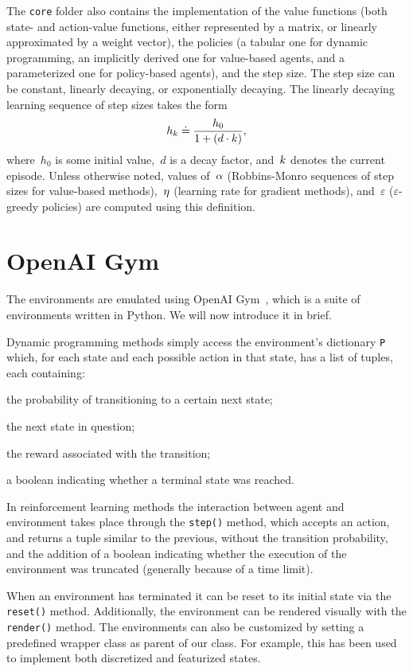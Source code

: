 The \texttt{core} folder also contains the implementation of the value functions (both state- and action-value functions, either represented by a matrix, or linearly approximated by a weight vector), the policies (a tabular one for dynamic programming, an implicitly derived one for value-based agents, and a parameterized one for policy-based agents), and the step size. The step size can be constant, linearly decaying, or exponentially decaying. The linearly decaying learning sequence of step sizes takes the form
\begin{equation}
    h_{k}\doteq\frac{h_{0}}{1+\left(d\cdot k\right)},
\end{equation}
where~${h_{0}}$ is some initial value,~${d}$ is a decay factor, and~${k}$ denotes the current episode. Unless otherwise noted, values of~${\alpha}$ (Robbins-Monro sequences of step sizes for value-based methods),~$\eta$ (learning rate for gradient methods), and~${\varepsilon}$ (${\varepsilon}$-greedy policies) are computed using this definition.

\section{OpenAI Gym}
The environments are emulated using OpenAI Gym~{\cite{brockman2016gym}}, which is a suite of environments written in Python. We will now introduce it in brief.

Dynamic programming methods simply access the environment's dictionary \texttt{P} which, for each state and each possible action in that state, has a list of tuples, each containing:
\begin{enumerate*}[label=\arabic*)]
    \item the probability of transitioning to a certain next state;
    \item the next state in question;
    \item the reward associated with the transition;
    \item a boolean indicating whether a terminal state was reached.
\end{enumerate*}

In reinforcement learning methods the interaction between agent and environment takes place through the \texttt{step()} method, which accepts an action, and returns a tuple similar to the previous, without the transition probability, and the addition of a boolean indicating whether the execution of the environment was truncated (generally because of a time limit).

When an environment has terminated it can be reset to its initial state via the \texttt{reset()} method. Additionally, the environment can be rendered visually with the \texttt{render()} method. The environments can also be customized by setting a predefined wrapper class as parent of our class. For example, this has been used to implement both discretized and featurized states.
